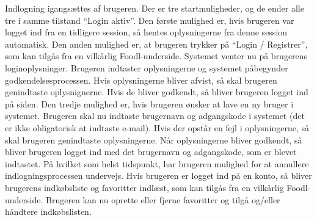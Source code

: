 {Indlogning igangsættes af brugeren. Der er tre startmuligheder, og de ender alle tre i samme tilstand “Login aktiv”. Den første mulighed er, hvis brugeren var logget ind fra en tidligere session, så hentes oplysningerne fra denne session automatisk. Den anden mulighed er, at brugeren trykker på “Login / Registrer”, som kan tilgås fra en vilkårlig Foodl-underside. Systemet venter nu på brugerens loginoplysninger. Brugeren indtaster oplysningerne og systemet påbegynder godkendelsesprocessen. Hvis oplysningerne bliver afvist, så skal brugeren genindtaste oplysnignerne. Hvis de bliver godkendt, så bliver brugeren logget ind på siden. Den tredje mulighed er, hvis brugeren ønsker at lave en ny bruger i systemet. Brugeren skal nu indtaste brugernavn og adgangskode i systemet (det er ikke obligatorisk at indtaste e-mail). Hvis der opstår en fejl i oplysningerne, så skal brugeren genindtaste oplysningerne. Når oplysningerne bliver godkendt, så bliver brugeren logget ind med det brugernavn og adgangskode, som er blevet indtastet. På hvilket som helst tidspunkt, har brugeren mulighed for at annullere indlogningsprocessen undervejs.
Hvis brugeren er logget ind på en konto, så bliver brugerens indkøbsliste og favoritter indlæst, som kan tilgås fra en vilkårlig Foodl-underside. Brugeren kan nu oprette eller fjerne favoritter og tilgå og/eller håndtere indkøbslisten.}
{}
{}
